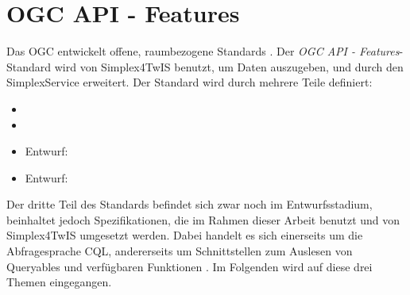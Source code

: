 \section{\acs{OGC} \acs{API} - Features}
\label{sec:ogc}

Das \acf{OGC} entwickelt offene, raumbezogene Standards  . Der \textit{OGC API - Features}-Standard wird von Simplex4TwIS benutzt, um Daten auszugeben, und durch den SimplexService erweitert. Der Standard wird durch mehrere Teile definiert:
\begin{itemize}
  \item {} 
  \item {} 
  \item Entwurf:  
  \item Entwurf:  
\end{itemize}

Der dritte Teil des Standards befindet sich zwar noch im Entwurfsstadium, beinhaltet jedoch Spezifikationen, die im Rahmen dieser Arbeit benutzt und von Simplex4TwIS umgesetzt werden. Dabei handelt es sich einerseits um die Abfragesprache \acf{CQL}, andererseits um Schnittstellen zum Auslesen von Queryables und verfügbaren Funktionen . Im Folgenden wird auf diese drei Themen eingegangen.

